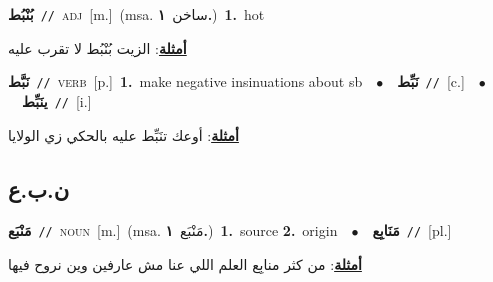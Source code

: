 \documentclass[10pt,a4paper,twoside]{article} %
\begin{document}
\begin{multicols}{2}
{\setlength\topsep{0pt}\textbf{\foreignlanguage{arabic}{بُنْبُط}}\ {\color{gray}\texttt{//}\color{black}}\ \textsc{adj}\ [m.]\ \color{gray}(msa. \foreignlanguage{arabic}{ساخن}~\foreignlanguage{arabic}{\textbf{١.}})\color{black}\ \textbf{1.}~hot\  \begin{flushright}\color{gray}\foreignlanguage{arabic}{\textbf{\underline{\foreignlanguage{arabic}{أمثلة}}}: الزيت بُنْبُط لا تقرب عليه}\end{flushright}\color{black}} \vspace{2mm}

{\setlength\topsep{0pt}\textbf{\foreignlanguage{arabic}{نَبَّط}}\ {\color{gray}\texttt{//}\color{black}}\ \textsc{verb}\ [p.]\ \textbf{1.}~make negative insinuations about sb\ \ $\bullet$\ \ \setlength\topsep{0pt}\textbf{\foreignlanguage{arabic}{نَبِّط}}\ {\color{gray}\texttt{//}\color{black}}\ [c.]\ \ $\bullet$\ \ \setlength\topsep{0pt}\textbf{\foreignlanguage{arabic}{ينَبِّط}}\ {\color{gray}\texttt{//}\color{black}}\ [i.]\  \begin{flushright}\color{gray}\foreignlanguage{arabic}{\textbf{\underline{\foreignlanguage{arabic}{أمثلة}}}: أوعك تنَبِّط عليه بالحكي زي الولايا}\end{flushright}\color{black}} \vspace{2mm}

\vspace{-3mm}
\subsection*{\color{blue}\foreignlanguage{arabic}{ن.ب.ع}\color{blue}{}} 

{\setlength\topsep{0pt}\textbf{\foreignlanguage{arabic}{مَنْبَع}}\ {\color{gray}\texttt{//}\color{black}}\ \textsc{noun}\ [m.]\ \color{gray}(msa. \foreignlanguage{arabic}{مَنْبَع}~\foreignlanguage{arabic}{\textbf{١.}})\color{black}\ \textbf{1.}~source  \textbf{2.}~origin\ \ $\bullet$\ \ \setlength\topsep{0pt}\textbf{\foreignlanguage{arabic}{مَنَابِع}}\ {\color{gray}\texttt{//}\color{black}}\ [pl.]\  \begin{flushright}\color{gray}\foreignlanguage{arabic}{\textbf{\underline{\foreignlanguage{arabic}{أمثلة}}}: من كثر منابِع العلم اللي عنا مش عارفين وين نروح فيها}\end{flushright}\color{black}} \vspace{2mm}


\end{multicols}
\end{document}
